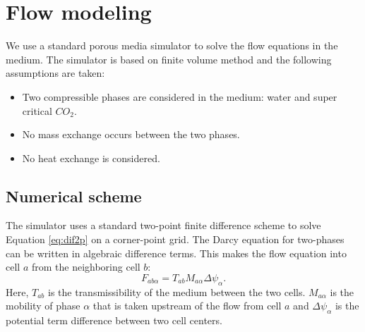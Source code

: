

\section{Flow modeling}
\label{sec:FolowModeling}

We use a standard porous media simulator \cite{sis2007eclipse} to solve the flow equations in the
medium. The simulator is based on finite volume method and the following
assumptions are taken:

\begin{itemize}

  \item Two compressible phases are considered in the medium: water and super
critical ${CO}_2$.
  \item No mass exchange occurs between the two phases.
  \item No heat exchange is considered.
 
\end{itemize}

\subsection{Numerical scheme}

The simulator uses a standard two-point finite difference scheme to solve
Equation \ref{eq:dif2p} on a corner-point grid. The Darcy equation for two-phases can be written in algebraic difference terms. This makes the flow equation into cell $a$ from the
neighboring cell $b$:
\begin{equation}
 F_{ab\alpha}=T_{ab}M_{a\alpha}\Delta \psi_{\alpha}.
\label{eq:eclF}
\end{equation} Here, $T_{ab}$ is the transmissibility of the medium between the two cells. $M_{a\alpha}$ is the mobility of phase $\alpha$ that is taken upstream of the flow from cell ${a}$ and $\Delta \psi_{\alpha}$ is the potential term difference between two cell centers. 


